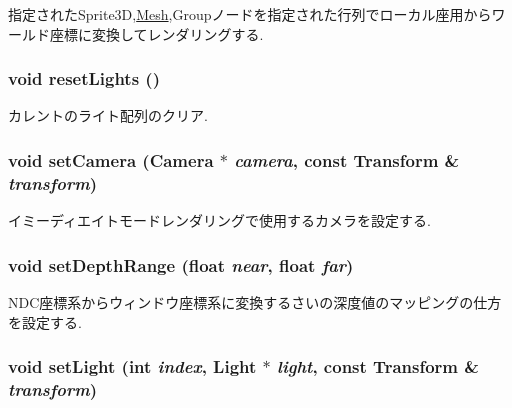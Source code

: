 指定されたSprite3D,\hyperlink{classm3g_1_1Mesh}{Mesh},Groupノードを指定された行列でローカル座用からワールド座標に変換してレンダリングする. \hypertarget{classm3g_1_1Graphics3D_b8821ec231e8ebd939ae0feaaf138542}{
\subsubsection[{resetLights}]{\setlength{\rightskip}{0pt plus 5cm}void resetLights ()}}
\label{classm3g_1_1Graphics3D_b8821ec231e8ebd939ae0feaaf138542}


カレントのライト配列のクリア. \hypertarget{classm3g_1_1Graphics3D_0df7bb61cfeba6626e20fd07ddd1c460}{
\subsubsection[{setCamera}]{\setlength{\rightskip}{0pt plus 5cm}void setCamera ({\bf Camera} $\ast$ {\em camera}, \/  const {\bf Transform} \& {\em transform})}}
\label{classm3g_1_1Graphics3D_0df7bb61cfeba6626e20fd07ddd1c460}


イミーディエイトモードレンダリングで使用するカメラを設定する. \hypertarget{classm3g_1_1Graphics3D_6fc3837286f3516aa3320aeec9729495}{
\subsubsection[{setDepthRange}]{\setlength{\rightskip}{0pt plus 5cm}void setDepthRange (float {\em near}, \/  float {\em far})}}
\label{classm3g_1_1Graphics3D_6fc3837286f3516aa3320aeec9729495}


NDC座標系からウィンドウ座標系に変換するさいの深度値のマッピングの仕方を設定する. \hypertarget{classm3g_1_1Graphics3D_2bf83cb69f50117dd9d5548fe96d0ab0}{
\subsubsection[{setLight}]{\setlength{\rightskip}{0pt plus 5cm}void setLight (int {\em index}, \/  {\bf Light} $\ast$ {\em light}, \/  const {\bf Transform} \& {\em transform})}}
\label{classm3g_1_1Graphics3D_2bf83cb69f50117dd9d5548fe96d0ab0}


